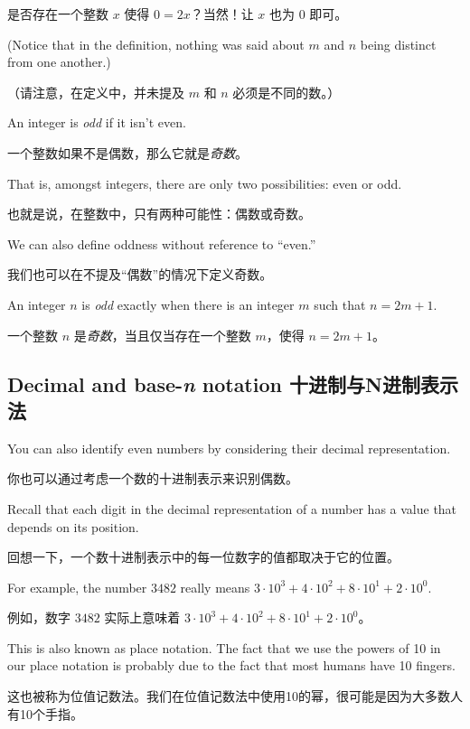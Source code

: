 是否存在一个整数 $x$ 使得 $0 = 2x$？当然！让 $x$ 也为 $0$ 即可。

(Notice that in the
definition, nothing was said about $m$ and $n$ being distinct from
one another.)  

（请注意，在定义中，并未提及 $m$ 和 $n$ 必须是不同的数。）

An integer is {\em odd} if it isn't even.

一个整数如果不是偶数，那么它就是{\em 奇数}。

That is, amongst integers,
there are only two possibilities: even or odd.

也就是说，在整数中，只有两种可能性：偶数或奇数。

We can also define
oddness without reference to ``even.''

我们也可以在不提及“偶数”的情况下定义奇数。

\begin{defi}
An integer $n$ is {\em odd} exactly when there is an integer $m$
such that $n = 2m + 1$.
\end{defi}

\begin{defi}
一个整数 $n$ 是{\em 奇数}，当且仅当存在一个整数 $m$，使得 $n = 2m + 1$。
\end{defi}


\subsection{Decimal and base-\emph{n} notation 十进制与N进制表示法}\label{base-n}

You can also identify even numbers by considering their
decimal representation.

你也可以通过考虑一个数的十进制表示来识别偶数。

Recall that each digit in the 
decimal representation of a number has a value that depends
on its position.

回想一下，一个数十进制表示中的每一位数字的值都取决于它的位置。

For example, the number $3482$ really means
$3\cdot10^3 + 4\cdot10^2 + 8\cdot10^1 + 2\cdot10^0$.

例如，数字 $3482$ 实际上意味着 $3\cdot10^3 + 4\cdot10^2 + 8\cdot10^1 + 2\cdot10^0$。

This 
is also known as place notation.  
The fact that we use the 
powers of 10 in our place notation is probably due to the
fact that most humans have 10 fingers.

这也被称为位值记数法。我们在位值记数法中使用10的幂，很可能是因为大多数人有10个手指。

